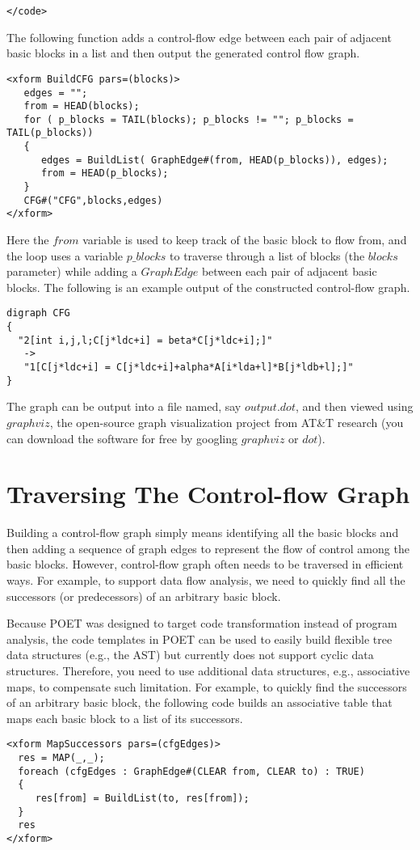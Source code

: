 \documentclass[11pt]{article}
\begin{document}
\begin {verbatim}
</code>
\end {verbatim}
The following function adds a control-flow edge between each pair of adjacent basic blocks in a list
and then output the generated control flow graph.
\begin {verbatim}
<xform BuildCFG pars=(blocks)>
   edges = "";
   from = HEAD(blocks);
   for ( p_blocks = TAIL(blocks); p_blocks != ""; p_blocks = TAIL(p_blocks))
   {  
      edges = BuildList( GraphEdge#(from, HEAD(p_blocks)), edges);
      from = HEAD(p_blocks);
   }   
   CFG#("CFG",blocks,edges)
</xform>
\end {verbatim}
Here the $from$ variable is used to keep track of the basic block to flow from, and the loop uses
a variable $p\_blocks$ to traverse through a list of blocks (the $blocks$ parameter) while adding 
a $GraphEdge$ between each pair of adjacent basic blocks. The following is an example output
of the constructed control-flow graph.
\begin {verbatim}
digraph CFG
{
  "2[int i,j,l;C[j*ldc+i] = beta*C[j*ldc+i];]"
   ->
   "1[C[j*ldc+i] = C[j*ldc+i]+alpha*A[i*lda+l]*B[j*ldb+l];]"
}
\end {verbatim}
The graph can be output into a file named, say $output.dot$, and then viewed using $graphviz$,
the open-source graph visualization project from AT\&T research (you can download the software
for free by googling $graphviz$ or $dot$).

\section {Traversing The Control-flow Graph}
Building a control-flow graph simply means identifying all the basic blocks and then
adding a sequence of graph edges to represent the flow of control among the basic blocks.
However, control-flow graph often needs to be traversed in efficient ways. 
For example, to support data flow analysis,  we need to quickly find all the successors 
(or predecessors) of an arbitrary basic block. 

Because POET was designed to target code transformation instead of program analysis,
the code templates in POET can be used to easily build flexible tree data structures (e.g., the AST)
but currently does not support cyclic data structures. 
Therefore, you need to use additional data structures, e.g., associative maps, to compensate
such limitation. For example,  to quickly find the successors of an arbitrary basic block,
the following code builds an associative table that maps each basic block to a list of its successors.
\begin {verbatim}
<xform MapSuccessors pars=(cfgEdges)>
  res = MAP(_,_);
  foreach (cfgEdges : GraphEdge#(CLEAR from, CLEAR to) : TRUE)
  {
     res[from] = BuildList(to, res[from]);
  }
  res
</xform>


\end{verbatim}
\end{document}

